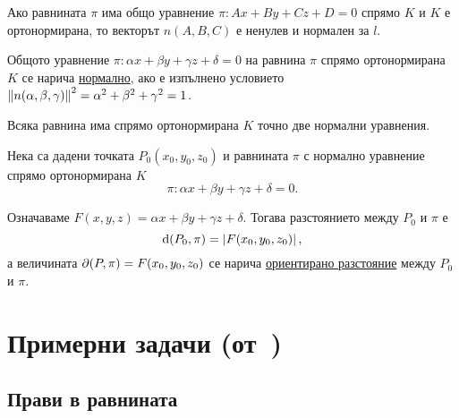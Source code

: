 \documentclass[numbers=endperiod, DIV=15]{scrartcl}
\begin{document}
\begin{proposition}
  Ако равнината $\pi$ има общо уравнение $\pi: Ax + By + Cz + D = 0$ спрямо $K$ и $K$ е ортонормирана, то векторът $n(A, B, C)$ е ненулев и нормален за $l$.
\end{proposition}

\begin{definition}
  Общото уравнение $\pi: \alpha x + \beta y + \gamma z + \delta = 0$ на равнина $\pi$ спрямо ортонормирана $K$ се нарича \underline{нормално}, ако е изпълнено условието $\left\Vert n(\alpha, \beta, \gamma) \right\Vert^2 = \alpha^2 + \beta^2 + \gamma^2 = 1$.
\end{definition}

\begin{proposition}
  Всяка равнина има спрямо ортонормирана $K$ точно две нормални уравнения.
\end{proposition}

\begin{theorem}
  Нека са дадени точката $P_0(x_0, y_0, z_0)$ и равнината $\pi$ с нормално уравнение спрямо ортонормирана $K$
  \begin{displaymath}
    \pi: \alpha x + \beta y + \gamma z + \delta = 0.
  \end{displaymath}

  Означаваме $F(x, y, z) = \alpha x + \beta y + \gamma z + \delta$. Тогава разстоянието между $P_0$ и $\pi$ е
  \begin{displaymath}
    \operatorname{d}(P_0, \pi) = \left\vert F(x_0, y_0, z_0) \right\vert,
  \end{displaymath}
  а величината $\partial(P, \pi) = F(x_0, y_0, z_0)$ се нарича \underline{ориентирано разстояние} между $P_0$ и $\pi$.
\end{theorem}
\section{Примерни задачи (от~\cite{Notes})}

\subsection{Прави в равнината}
\end{document}
